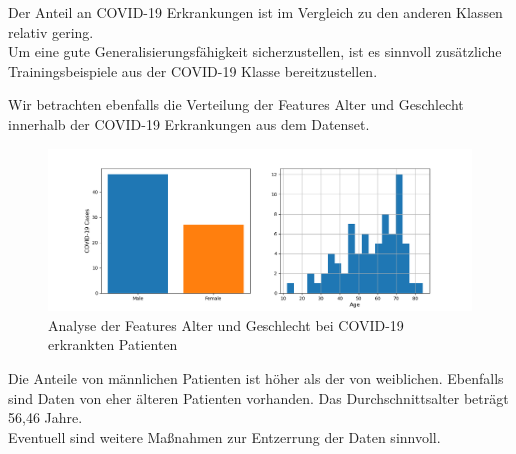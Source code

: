 Der Anteil an COVID-19 Erkrankungen ist im Vergleich zu den anderen Klassen relativ gering.\\
Um eine gute Generalisierungsfähigkeit sicherzustellen, ist es sinnvoll zusätzliche Trainingsbeispiele aus der COVID-19 Klasse bereitzustellen.

Wir betrachten ebenfalls die Verteilung der Features Alter und Geschlecht innerhalb der COVID-19 Erkrankungen aus dem Datenset.

\begin{figure}[ht]
	\centering
	\includegraphics[width=\textwidth]{../features_analysis.png}
	\caption{Analyse der Features Alter und Geschlecht bei COVID-19 erkrankten Patienten}
\end{figure}

Die Anteile von männlichen Patienten ist höher als der von weiblichen. Ebenfalls sind Daten von eher älteren Patienten vorhanden. Das Durchschnittsalter beträgt 56,46 Jahre.\\
Eventuell sind weitere Maßnahmen zur Entzerrung der Daten sinnvoll.